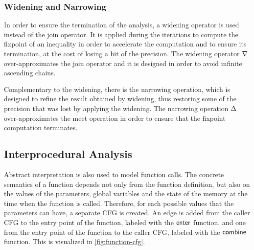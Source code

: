 \subsubsection{Widening and Narrowing}

In order to ensure the termination of the analysis, a widening operator is used instead of the
join operator. It is applied during the iterations to compute the fixpoint of an inequality
in order to accelerate the computation and to ensure its termination, at the cost of losing a bit of the precision.
The widening operator $\nabla$ over-approximates the join operator and it is designed in order to avoid infinite ascending chains.

Complementary to the widening, there is the narrowing operation, which is designed to
refine the result obtained by widening, thus restoring some of the precision that was lost by applying the widening.
The narrowing operation $\Delta$ over-approximates the meet operation in order to ensure that the fixpoint computation terminates.

\subsection{Interprocedural Analysis}

Abstract interpretation is also used to model function calls.
The concrete semantics of a function depends not only from the function definition, but also on the values of the parameters, global variables and the state of the memory at the time when the function is called.
Therefore, for each possible values that the parameters can have, a separate CFG is created.
An edge is added from the caller CFG to the entry point of the function, labeled with the $\textsf{enter}$ function, and one from the entry point
of the function to the caller CFG, labeled with the $\textsf{combine}$ function.
This is visualized in \cref{fig:function-cfg}.

